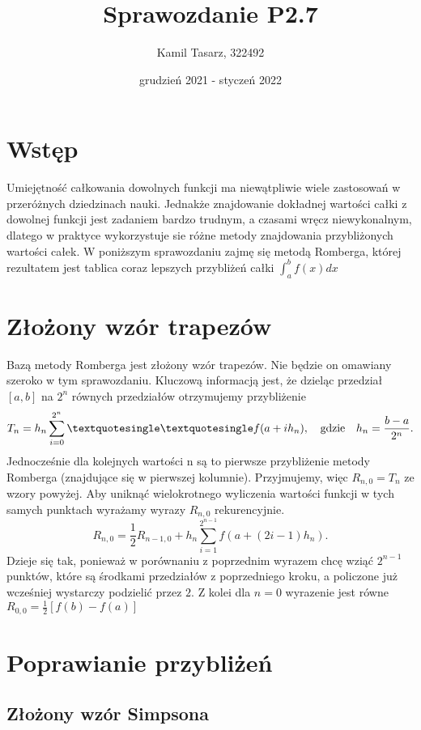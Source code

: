 \documentclass[a4paper,12pt]{article}
\title{Sprawozdanie P2.7}
\author{Kamil Tasarz, 322492}
\date{grudzień 2021 - styczeń 2022}
\begin{document}
\maketitle


\section{Wstęp}

Umiejętność całkowania dowolnych funkcji ma niewątpliwie wiele zastosowań w przeróżnych dziedzinach nauki. Jednakże znajdowanie dokładnej wartości całki z dowolnej funkcji jest zadaniem bardzo trudnym, a czasami wręcz niewykonalnym, dlatego w praktyce wykorzystuje sie różne metody znajdowania przybliżonych wartości całek. W poniższym sprawozdaniu zajmę się metodą Romberga, której rezultatem jest tablica coraz lepszych przybliżeń całki $ \int_a^b f(x) dx$

\section{Złożony wzór trapezów}
Bazą metody Romberga jest złożony wzór trapezów. Nie będzie on omawiany szeroko w tym sprawozdaniu. Kluczową informacją jest, że dzieląc przedział $[a, b]$ na $2^n$ równych przedziałów otrzymujemy przybliżenie
$$T_n = h_n \sum_{i=0}^{2^n} \textquotesingle \textquotesingle f(a+ ih_n), \quad \text{gdzie} \quad h_n = \frac{b-a}{2^n}.$$
Jednocześnie dla kolejnych wartości n są to pierwsze przybliżenie metody Romberga (znajdujące się w pierwszej kolumnie). Przyjmujemy, więc $ R_{n, 0} = T_n$ ze wzory powyżej. Aby uniknąć wielokrotnego wyliczenia wartości funkcji w tych samych punktach wyrażamy wyrazy $R_{n, 0}$ rekurencyjnie.
$$R_{n, 0} = \frac{1}{2}R_{n-1, 0} + h_n \sum_{i=1}^{2^{n-1}} f(a+(2i -1)h_n).$$
Dzieje się tak, ponieważ w porównaniu z poprzednim wyrazem chcę wziąć $2^{n-1}$ punktów, które są środkami przedziałów z poprzedniego kroku, a policzone już wcześniej wystarczy podzielić przez $2$. Z kolei dla $n=0$ wyrazenie jest równe $R_{0, 0} = \frac{1}{2}[f(b)-f(a)]$

\section{Poprawianie przybliżeń}

\subsection{Złożony wzór Simpsona}
\end{document}
